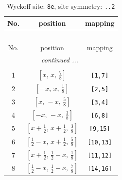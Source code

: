 \documentclass[fleqn,8pt]{jsarticle}
\begin{document}
\begin{longtable}{ccc}
\caption{Wyckoff site: {\tt 8e}, site symmetry: {\tt ..2}}
 \\
 \hline \hline
No. & position & mapping \\ \hline \endfirsthead

\multicolumn{2}{l}{\tablename\ \thetable{}} \\
 \hline \hline
No. & position & mapping \\ \hline \endhead

 \hline \hline
\multicolumn{2}{r}{\footnotesize\it continued ...} \\ \endfoot

 \hline \hline
\multicolumn{2}{r}{} \\ \endlastfoot

1 & $\left[ x,\, x,\, \frac{7}{8} \right]$ & {\tt [1,7]} \\ \hline
2 & $\left[ - x,\, x,\, \frac{1}{8} \right]$ & {\tt [2,5]} \\ \hline
3 & $\left[ x,\, - x,\, \frac{5}{8} \right]$ & {\tt [3,4]} \\ \hline
4 & $\left[ - x,\, - x,\, \frac{3}{8} \right]$ & {\tt [6,8]} \\ \hline
5 & $\left[ x + \frac{1}{2},\, x + \frac{1}{2},\, \frac{3}{8} \right]$ & {\tt [9,15]} \\ \hline
6 & $\left[ \frac{1}{2} - x,\, x + \frac{1}{2},\, \frac{5}{8} \right]$ & {\tt [10,13]} \\ \hline
7 & $\left[ x + \frac{1}{2},\, \frac{1}{2} - x,\, \frac{1}{8} \right]$ & {\tt [11,12]} \\ \hline
8 & $\left[ \frac{1}{2} - x,\, \frac{1}{2} - x,\, \frac{7}{8} \right]$ & {\tt [14,16]} \\
\end{longtable}
\renewcommand{\arraystretch}{1.2}
\end{document}
